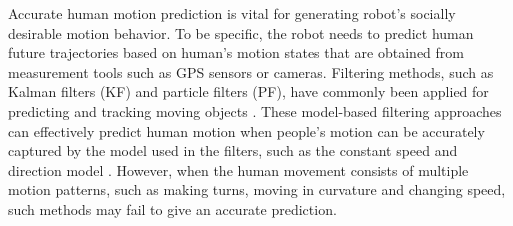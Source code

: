 \documentclass[journal]{IEEEtran}
\newcommand{\todonote}[1]{\vspace{0px} %
	\todo[inline, color=green!30]{\textbf{[Note:]} {#1}} %
}
\newcommand{\todohere}[1]{\hl{(\textbf{TODO:} #1)}}
\begin{document}
Accurate human motion prediction is vital for generating robot's socially desirable motion behavior.
	To be specific, the robot needs to predict human future trajectories based on human's motion states that are obtained from measurement tools such as GPS sensors or cameras.
	Filtering methods, such as Kalman filters (KF) and particle filters (PF), have commonly been applied for predicting and tracking moving objects \cite {koller1994robust,rui2001better,yi2015single}.
    These model-based filtering approaches can effectively predict human motion when people's motion can be accurately captured by the model used in the filters, such as the constant speed and direction model \cite{svenstrup2010trajectory,cosgun2013autonomous}.
	 However, when the human movement consists of multiple motion patterns, such as making turns, moving in curvature and changing speed, such methods may fail to give an accurate prediction.
	
	
\end{document}
